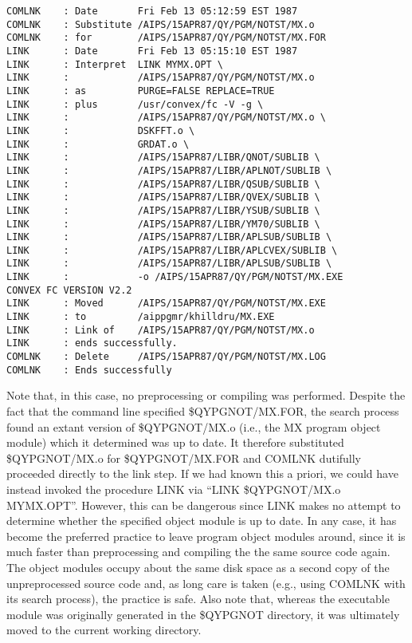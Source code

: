 \begin{verbatim}
COMLNK    : Date       Fri Feb 13 05:12:59 EST 1987
COMLNK    : Substitute /AIPS/15APR87/QY/PGM/NOTST/MX.o
COMLNK    : for        /AIPS/15APR87/QY/PGM/NOTST/MX.FOR
LINK      : Date       Fri Feb 13 05:15:10 EST 1987
LINK      : Interpret  LINK MYMX.OPT \
LINK      :            /AIPS/15APR87/QY/PGM/NOTST/MX.o
LINK      : as         PURGE=FALSE REPLACE=TRUE
LINK      : plus       /usr/convex/fc -V -g \
LINK      :            /AIPS/15APR87/QY/PGM/NOTST/MX.o \
LINK      :            DSKFFT.o \
LINK      :            GRDAT.o \
LINK      :            /AIPS/15APR87/LIBR/QNOT/SUBLIB \
LINK      :            /AIPS/15APR87/LIBR/APLNOT/SUBLIB \
LINK      :            /AIPS/15APR87/LIBR/QSUB/SUBLIB \
LINK      :            /AIPS/15APR87/LIBR/QVEX/SUBLIB \
LINK      :            /AIPS/15APR87/LIBR/YSUB/SUBLIB \
LINK      :            /AIPS/15APR87/LIBR/YM70/SUBLIB \
LINK      :            /AIPS/15APR87/LIBR/APLSUB/SUBLIB \
LINK      :            /AIPS/15APR87/LIBR/APLCVEX/SUBLIB \
LINK      :            /AIPS/15APR87/LIBR/APLSUB/SUBLIB \
LINK      :            -o /AIPS/15APR87/QY/PGM/NOTST/MX.EXE
CONVEX FC VERSION V2.2
LINK      : Moved      /AIPS/15APR87/QY/PGM/NOTST/MX.EXE
LINK      : to         /aippgmr/khilldru/MX.EXE
LINK      : Link of    /AIPS/15APR87/QY/PGM/NOTST/MX.o
LINK      : ends successfully.
COMLNK    : Delete     /AIPS/15APR87/QY/PGM/NOTST/MX.LOG
COMLNK    : Ends successfully

\end{verbatim}
Note that, in this case, no preprocessing or compiling was performed.
Despite the fact that the command line specified \$QYPGNOT/MX.FOR, the
search process found an extant version of \$QYPGNOT/MX.o (i.e., the MX
program object module) which it determined was up to date. It
therefore substituted \$QYPGNOT/MX.o for \$QYPGNOT/MX.FOR and COMLNK
dutifully proceeded directly to the link step.  If we had known this a
priori, we could have instead invoked the procedure LINK via ``LINK
\$QYPGNOT/MX.o MYMX.OPT''.  However, this can be dangerous since LINK
makes no attempt to determine whether the specified object module is
up to date.  In any case, it has become the preferred practice to
leave program object modules around, since it is much faster than
preprocessing and compiling the the same source code again.  The
object modules occupy about the same disk space as a second copy of
the unpreprocessed source code and, as long care is taken (e.g., using
COMLNK with its search process), the practice is safe.  Also note
that, whereas the executable module was originally generated in the
\$QYPGNOT directory, it was ultimately moved to the current working
directory.

